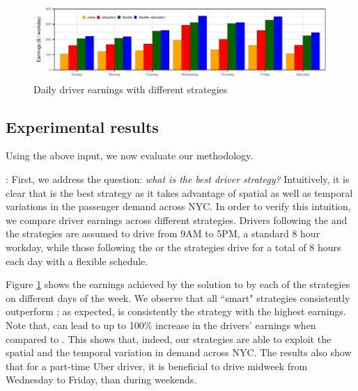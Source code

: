 \fi

\begin{figure}
	\centering
	\includegraphics{figures/daily_earnings.pdf}
	\caption{Daily driver earnings with different strategies}
	\label{fig:daily_earnings}
\end{figure}
\subsection{Experimental results}
Using the above input, we now evaluate our methodology.

: First, we address the question: \textit{what is the best driver strategy?} Intuitively, it is clear that {\relocationflexible} is the best strategy as it takes advantage of spatial as well as temporal variations in the passenger demand across NYC. In order to verify this intuition, we compare driver earnings across different strategies. Drivers following the {\naive} and the {\relocation} strategies are assumed to drive from 9AM to 5PM, a standard 8 hour workday, while those following the {\flexible} or the {\relocationflexible} strategies drive for a total of 8 hours each day with a flexible schedule.

Figure \ref{fig:daily_earnings} shows the earnings achieved by 
the solution to {\originalproblem} by each of the strategies on different days of the week. We observe that all ``smart" strategies consistently outperform {\naive};
as expected, {\relocationflexible} is consistently the strategy with the highest earnings.
Note that, {\relocationflexible} can lead to up to 100\% increase in the drivers'
earnings when compared to {\naive}.  
This shows that, indeed, our strategies are able to exploit the spatial and the temporal variation in demand across NYC. The results also show
that for a part-time Uber driver, it is beneficial to drive midweek from Wednesday to Friday, than during weekends.


